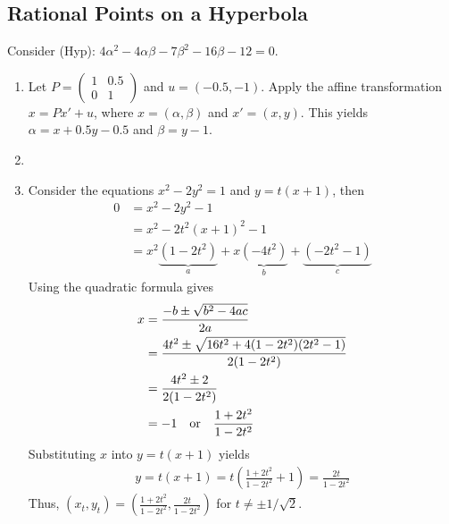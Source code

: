 \documentclass{article}
\begin{document}
\subsection{Rational Points on a Hyperbola}
  Consider (Hyp): $4\alpha^2-4\alpha\beta-7\beta^2-16\beta-12=0$.
  \begin{enumerate}[label=\textbf{(\alph*)}]
    \item{
      Let $P=\left(\begin{smallmatrix}1&0.5\\0&1\end{smallmatrix}\right)$ and
      $u=(-0.5,-1)$. Apply the affine transformation $x=Px'+u$, where $x=(
      \alpha,\beta)$ and $x'=(x,y)$. This yields $\alpha=x+0.5y-0.5$ and $\beta
      =y-1$.
    }
    \item{
      \begin{figure}[H]
        \hspace*{1cm}
      \end{figure}
    }
    \item{
      Consider the equations $x^2-2y^2=1$ and $y=t(x+1)$, then
      \begin{align*}
        0 &= x^2-2y^2-1\\
          &= x^2-2t^2(x+1)^2-1\\
          &= x^2\underbrace{(1-2t^2)}_a+x\underbrace{(-4t^2)}_b+
            \underbrace{(-2t^2-1)}_c
      \end{align*}
      Using the quadratic formula gives
      \begin{align*}
        x &= \frac{-b\pm\sqrt{b^2-4ac}}{2a}\\
          &= \frac{4t^2\pm\sqrt{16t^2+4(1-2t^2)(2t^2-1)}}{2(1-2t^2)}\\
          &= \frac{4t^2\pm2}{2(1-2t^2)}\\
          &=-1\text{\quad or\quad}\frac{1+2t^2}{1-2t^2}\\
      \end{align*}
      Substituting $x$ into $y=t(x+1)$ yields
      \begin{align*}
        y = t(x+1)
          = t\left(\frac{1+2t^2}{1-2t^2}+1\right)
          = \frac{2t}{1-2t^2}
      \end{align*}
      Thus, $(x_t,y_t)=\left(\frac{1+2t^2}{1-2t^2},\frac{2t}{1-2t^2}\right)$ for
      $t\ne\pm1/\sqrt{2}$.

}
\end{enumerate}
\end{document}
